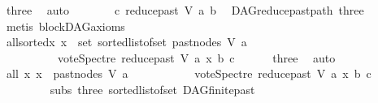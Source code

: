 \begin{isabellebody}
\ three\ \isamarkupfalse%
\ auto\isanewline
\ \ \ \ \isamarkupfalse%
\ \isamarkupfalse%
\ {\isachardoublequoteopen}c\ {\isasymrightarrow}\isactrlsup {\isacharplus}{\kern0pt}\isactrlbsub reduce{\isacharunderscore}{\kern0pt}past\ V\ a\isactrlesub \ b{\isachardoublequoteclose}\ \isamarkupfalse%
\ DAG{\isachardot}{\kern0pt}reduce{\isacharunderscore}{\kern0pt}past{\isacharunderscore}{\kern0pt}path{}\ three\ {}\isanewline
\ \ \ \ \ \ \isamarkupfalse%
\ {\isacharparenleft}{\kern0pt}metis\ blockDAG{\isachardot}{\kern0pt}axioms{\isacharparenleft}{\kern0pt}{}{\isacharparenright}{\kern0pt}{\isacharparenright}{\kern0pt}\ \isanewline
\ \ \ \ \isamarkupfalse%
\ \isamarkupfalse%
\ allsorted{}{}{\isacharcolon}{\kern0pt}{\isachardoublequoteopen}{\isasymforall}x{\isachardot}{\kern0pt}\ x\ {\isasymin}\ set\ {\isacharparenleft}{\kern0pt}sorted{\isacharunderscore}{\kern0pt}list{\isacharunderscore}{\kern0pt}of{\isacharunderscore}{\kern0pt}set\ {\isacharparenleft}{\kern0pt}past{\isacharunderscore}{\kern0pt}nodes\ V\ a{\isacharparenright}{\kern0pt}{\isacharparenright}{\kern0pt}\ {\isasymlongrightarrow}\isanewline
\ \ \ \ \ \ \ \ \ \ vote{\isacharunderscore}{\kern0pt}Spectre\ {\isacharparenleft}{\kern0pt}reduce{\isacharunderscore}{\kern0pt}past\ V\ a{\isacharparenright}{\kern0pt}\ x\ b\ c\ {\isasymin}\ {\isacharbraceleft}{\kern0pt}{}{\isacharcomma}{\kern0pt}\ {}{\isacharbraceright}{\kern0pt}{\isachardoublequoteclose}\ \isamarkupfalse%
\ {}\ three\ \isamarkupfalse%
\ auto\isanewline
\ \ \ \ \isamarkupfalse%
\ \isamarkupfalse%
\ all{}{}{\isacharcolon}{\kern0pt}\ {\isachardoublequoteopen}{\isasymforall}x{\isachardot}{\kern0pt}\ x\ {\isasymin}\ {\isacharparenleft}{\kern0pt}past{\isacharunderscore}{\kern0pt}nodes\ V\ a{\isacharparenright}{\kern0pt}\ {\isasymlongrightarrow}\isanewline
\ \ \ \ \ \ \ \ \ \ vote{\isacharunderscore}{\kern0pt}Spectre\ {\isacharparenleft}{\kern0pt}reduce{\isacharunderscore}{\kern0pt}past\ V\ a{\isacharparenright}{\kern0pt}\ x\ b\ c\ {\isasymin}\ {\isacharbraceleft}{\kern0pt}{}{\isacharcomma}{\kern0pt}\ {}{\isacharbraceright}{\kern0pt}{\isachardoublequoteclose}\isanewline
\ \ \ \ \ \ \isamarkupfalse%
\ \ subs\ three\ sorted{\isacharunderscore}{\kern0pt}list{\isacharunderscore}{\kern0pt}of{\isacharunderscore}{\kern0pt}set{\isacharparenleft}{\kern0pt}{}{\isacharparenright}{\kern0pt}\ DAG{\isachardot}{\kern0pt}finite{\isacharunderscore}{\kern0pt}past\isanewline

\end{isabellebody}
